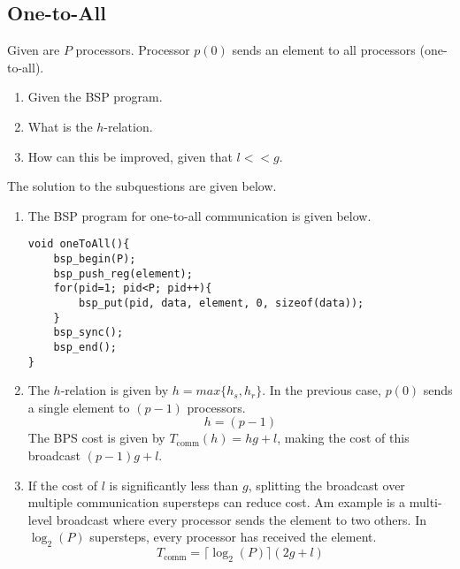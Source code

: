 \documentclass[../main.tex]{subfiles}
\begin{document}
\subsection{One-to-All}
\label{q:onetoall}
\begin{question}
Given are $P$ processors. Processor $p(0)$ sends an element to all processors (one-to-all).
\begin{enumerate}
	\item Given the BSP program.
	\item What is the $h$-relation.
	\item How can this be improved, given that $l << g$.
\end{enumerate}
\end{question}
\begin{solution} The solution to the subquestions are given below.
\begin{enumerate}
	\item The BSP program for one-to-all communication is given below.
\begin{lstlisting}
void oneToAll(){
	bsp_begin(P);
	bsp_push_reg(element);
	for(pid=1; pid<P; pid++){
		bsp_put(pid, data, element, 0, sizeof(data));
	}
	bsp_sync();
	bsp_end();
}
\end{lstlisting}
	\item The $h$-relation is given by $h = max\{h_s,h_r\}$. In the previous case, $p(0)$ sends a single element to
	$(p-1)$ processors.
	\begin{equation}
		h = (p - 1)
	\end{equation}
	The BPS cost is given by $T_\text{comm}(h) = hg + l$, making the cost of this broadcast $(p-1)g + l$.
	\item If the cost of $l$ is significantly less than $g$, splitting the broadcast over multiple communication
	supersteps can reduce cost. Am example is a multi-level broadcast where every processor sends the element to two
	others. In $\log_2(P)$ supersteps, every processor has received the element.
	\begin{equation}
		T_\text{comm} = \lceil \log_2(P) \rceil (2g + l)
	\end{equation}
\end{enumerate}


\end{solution}
\end{document}
